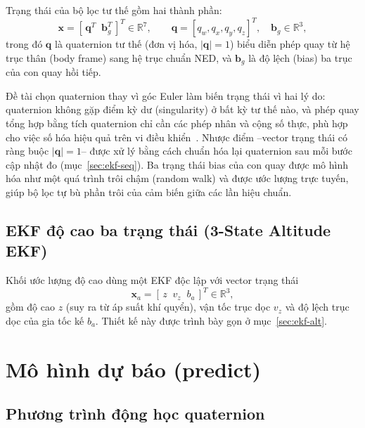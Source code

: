 Trạng thái của bộ lọc tư thế gồm hai thành phần:
\begin{equation}
\mathbf{x} = \left[\, \mathbf{q}^{T} \;\; \mathbf{b}_g^{T} \,\right]^{T} \in \mathbb{R}^{7}, \qquad
\mathbf{q} = \left[q_w, q_x, q_y, q_z\right]^{T}, \quad \mathbf{b}_g \in \mathbb{R}^{3},
\end{equation}
trong đó $\mathbf{q}$ là quaternion tư thế (đơn vị hóa, $|\mathbf{q}| = 1$) biểu diễn phép quay từ hệ trục thân (body frame) sang hệ trục chuẩn NED, và $\mathbf{b}_g$ là độ lệch (bias) ba trục của con quay hồi tiếp.

Đề tài chọn quaternion thay vì góc Euler làm biến trạng thái vì hai lý do: quaternion không gặp điểm kỳ dư (singularity) ở bất kỳ tư thế nào, và phép quay tổng hợp bằng tích quaternion chỉ cần các phép nhân và cộng số thực, phù hợp cho việc số hóa hiệu quả trên vi điều khiển~\cite{sola2017}. Nhược điểm --vector trạng thái có ràng buộc $|\mathbf{q}|=1$-- được xử lý bằng cách chuẩn hóa lại quaternion sau mỗi bước cập nhật đo (mục~\ref{sec:ekf-seq}). Ba trạng thái bias của con quay được mô hình hóa như một quá trình trôi chậm (random walk) và được ước lượng trực tuyến, giúp bộ lọc tự bù phần trôi của cảm biến giữa các lần hiệu chuẩn.

\subsection{EKF độ cao ba trạng thái (3-State Altitude EKF)}

Khối ước lượng độ cao dùng một EKF độc lập với vector trạng thái
\begin{equation}
\mathbf{x}_a = \left[\, z \;\; v_z \;\; b_a \,\right]^{T} \in \mathbb{R}^{3},
\end{equation}
gồm độ cao $z$ (suy ra từ áp suất khí quyển), vận tốc trục dọc $v_z$ và độ lệch trục dọc của gia tốc kế $b_a$. Thiết kế này được trình bày gọn ở mục~\ref{sec:ekf-alt}.

\section{Mô hình dự báo (predict)}

\subsection{Phương trình động học quaternion}

